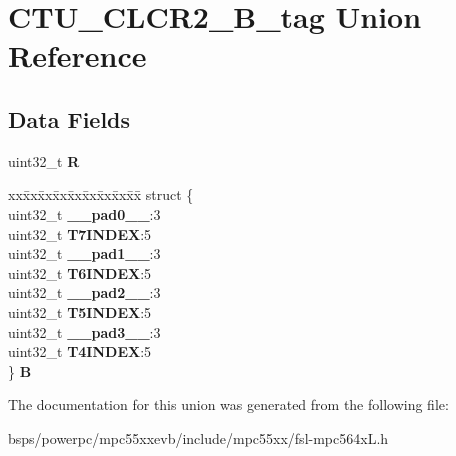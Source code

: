 \hypertarget{unionCTU__CLCR2__32B__tag}{}\section{C\+T\+U\+\_\+\+C\+L\+C\+R2\+\_\+B\+\_\+tag Union Reference}
\label{unionCTU__CLCR2__32B__tag}
\subsection*{Data Fields}
\begin{DoxyCompactItemize}
\item 
\mbox{\label{unionCTU__CLCR2__32B__tag_aa5bae8b5d7f4aca854d9bf36c1794653}} 
uint32\+\_\+t {\bfseries R}
\item 
\mbox{\label{unionCTU__CLCR2__32B__tag_ac487102c95a139e00cc3f4c9b5f8d5b2}} 
\begin{tabbing}
xx\=xx\=xx\=xx\=xx\=xx\=xx\=xx\=xx\=\kill
struct \{\\
\>uint32\_t {\bfseries \_\_pad0\_\_}:3\\
\>uint32\_t {\bfseries T7INDEX}:5\\
\>uint32\_t {\bfseries \_\_pad1\_\_}:3\\
\>uint32\_t {\bfseries T6INDEX}:5\\
\>uint32\_t {\bfseries \_\_pad2\_\_}:3\\
\>uint32\_t {\bfseries T5INDEX}:5\\
\>uint32\_t {\bfseries \_\_pad3\_\_}:3\\
\>uint32\_t {\bfseries T4INDEX}:5\\
\} {\bfseries B}\\

\end{tabbing}\end{DoxyCompactItemize}


The documentation for this union was generated from the following file\+:\begin{DoxyCompactItemize}
\item 
bsps/powerpc/mpc55xxevb/include/mpc55xx/fsl-\/mpc564x\+L.\+h\end{DoxyCompactItemize}
